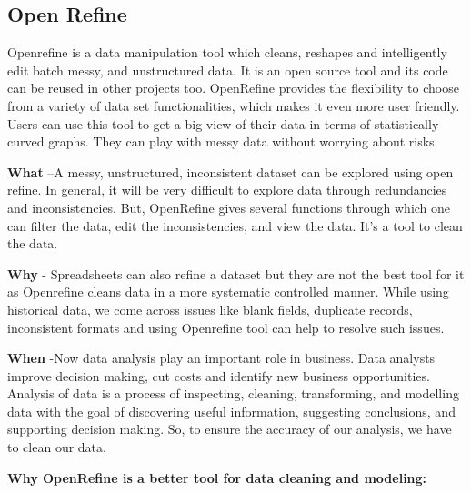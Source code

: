 \documentclass[]{book}
\begin{document}
\subsection{Open Refine}\label{open-refine}

Openrefine is a data manipulation tool which cleans, reshapes and
intelligently edit batch messy, and unstructured data. It is an open
source tool and its code can be reused in other projects too. OpenRefine
provides the flexibility to choose from a variety of data set
functionalities, which makes it even more user friendly. Users can use
this tool to get a big view of their data in terms of statistically
curved graphs. They can play with messy data without worrying about
risks.

\textbf{What } --A messy, unstructured, inconsistent dataset can be
explored using open refine. In general, it will be very difficult to
explore data through redundancies and inconsistencies. But, OpenRefine
gives several functions through which one can filter the data, edit the
inconsistencies, and view the data. It's a tool to clean the data.

\textbf{Why }- Spreadsheets can also refine a dataset but they are not
the best tool for it as Openrefine cleans data in a more systematic
controlled manner. While using historical data, we come across issues
like blank fields, duplicate records, inconsistent formats and using
Openrefine tool can help to resolve such issues.

\textbf{When }-Now data analysis play an important role in business.
Data analysts improve decision making, cut costs and identify new
business opportunities. Analysis of data is a process of inspecting,
cleaning, transforming, and modelling data with the goal of discovering
useful information, suggesting conclusions, and supporting decision
making. So, to ensure the accuracy of our analysis, we have to clean our
data.

\textbf{Why OpenRefine is a better tool for data cleaning and modeling:
}
\end{document}
